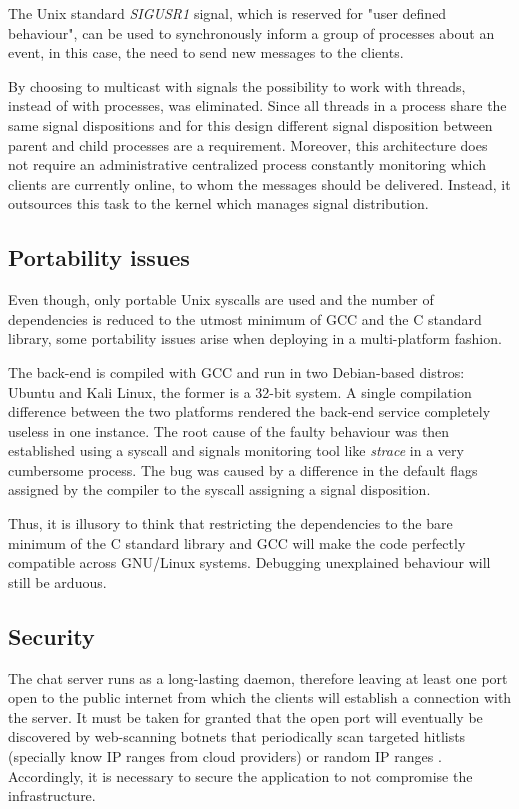 The Unix standard \textit{SIGUSR1} signal, which is reserved for "user defined behaviour", can be used to synchronously inform a group of processes about an event, in this case, the need to send new messages to the clients.

By choosing to multicast with signals the possibility to work with threads, instead of with processes, was eliminated. Since all threads in a process share the same signal dispositions and for this design different signal disposition between parent and child processes are a requirement. Moreover, this architecture does not require an administrative centralized process constantly monitoring which clients are currently online, to whom the messages should be delivered. Instead, it outsources this task to the kernel which manages signal distribution.


\subsection{Portability issues}
Even though, only portable Unix syscalls are used and the number of dependencies is reduced to the utmost minimum of GCC and the C standard library, some portability issues arise when deploying in a multi-platform fashion.

The back-end is compiled with GCC and run in two Debian-based distros: Ubuntu and Kali Linux, the former is a 32-bit system. A single compilation difference between the two platforms rendered the back-end service completely useless in one instance. The root cause of the faulty behaviour was then established using a syscall and signals monitoring tool like \textit{strace} in a very cumbersome process. The bug was caused by a difference in the default flags assigned by the compiler to the syscall assigning a signal disposition.

Thus, it is illusory to think that restricting the dependencies to the bare minimum of the C standard library and GCC will make the code perfectly compatible across GNU/Linux systems. Debugging unexplained behaviour will still be arduous.

\subsection{Security}
The chat server runs as a long-lasting daemon, therefore leaving at least one port open to the public internet from which the clients will establish a connection with the server. It must be taken for granted that the open port will eventually be discovered by web-scanning botnets that periodically scan targeted hitlists (specially know IP ranges from cloud providers) or random IP ranges \cite{Mirkovic2004}\cite{Graham}. Accordingly, it is necessary to secure the application to not compromise the infrastructure.


